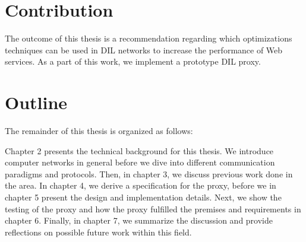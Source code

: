\section{Contribution}

The outcome of this thesis is a recommendation regarding which optimizations
techniques can be used in DIL networks to increase the performance of Web
services. As a part of this work, we implement a prototype DIL proxy.

\section{Outline}

The remainder of this thesis is organized as follows:

Chapter 2 presents the technical background for this thesis. We introduce
computer networks in general before we dive into different communication
paradigms and protocols. Then, in chapter 3, we discuss previous work done in
the area. In chapter 4, we derive a specification for the proxy, before we in
chapter 5 present the design and implementation details. Next, we show the
testing of the proxy and how the proxy fulfilled the premises and requirements
in chapter 6. Finally, in chapter 7, we summarize the discussion and provide
reflections on possible future work within this field.
